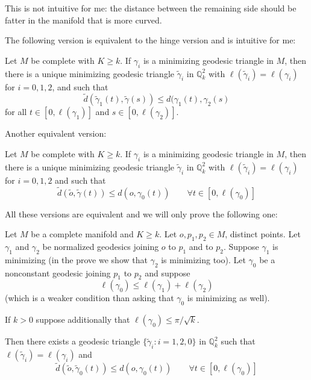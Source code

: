 This is not intuitive for me: the distance
between the remaining side should be
fatter in the manifold that is more curved.

The following version is equivalent to the
hinge version and is intuitive for
me:

\begin{theorem}[Toponogov]
\label{theorem-Toponogov-hinge2}
Let $M$ be complete with $K\geq k$. If
$\gamma_i$ is a minimizing geodesic
triangle in $M$, then there is a unique
minimizing geodesic triangle
$\tilde{\gamma}_i$ in $\mathbb{Q}_k^2$ with
$\ell(\tilde{\gamma}_i)=\ell(\gamma_i)$ for
$i=0,1,2$, and such that
\begin{equation}
\label{equation-Toponogov-hinge2}
\tilde{d}(\tilde{\gamma}_1(t),\tilde{\gamma}
(s))\leq
d(\gamma_1(t),\gamma_2(s)
\end{equation}
for all $t\in[0,\ell(\gamma_1)]$ and
$s\in[0,\ell(\gamma_2)]$.
\end{theorem}

Another equivalent version:
\begin{theorem}[Toponogov]
\label{theorem-Toponogov-hinge3}
Let $M$ be complete with $K\geq k$. If
$\gamma_i$ is a minimizing geodesic
triangle in $M$, then there is a unique
minimizing geodesic triangle
$\tilde{\gamma}_i$ in $\mathbb{Q}_k^2$ with
$\ell(\tilde{\gamma}_i)=\ell(\gamma_i)$ for
$i=0,1,2$ and such that
\begin{equation}
\label{equation-Toponogov-hinge3}
\tilde{d}(\tilde{o},\tilde{\gamma}(t))\leq
d(o,\gamma_0(t))
\qquad \forall t\in[0,\ell(\gamma_0)]
\end{equation}
\end{theorem}
All these versions are equivalent and we will
only prove the following one:
\begin{theorem}
\label{theorem-Toponogov-metric}
Let $M$ be a complete manifold and $K \geq
k$. Let $o,p_1,p_2 \in M$, distinct
points. Let $\gamma_1$ and $\gamma_2$ be
normalized geodesics joining
$o$ to $p_1$ and to $p_2$. Suppose $\gamma_1$
is minimizing (in the prove we
show that $\gamma_2$ is minimizing too).
Let $\gamma_0$ be a nonconstant geodesic
joining $p_1$ to $p_2$ and suppose
$$
\ell(\gamma_0) \leq \ell(\gamma_1)
+\ell(\gamma_2)
$$
(which is a weaker condition than asking that
$\gamma_0$ is minimizing as well).

If $k>0$ suppose additionally that
$\ell(\gamma_0) \leq \pi/\sqrt{k}$.

Then there exists a geodesic triangle
$\{\tilde{\gamma}_i:i=1,2,0\}$ in
$\mathbb{Q}_k^2$ such that
$\ell(\tilde{\gamma}_i) = \ell(\gamma_i)$ and
\begin{equation}
\label{equation-Toponogov-metric}
\tilde{d}(\tilde{o},\tilde{\gamma}_0(t))
\leq  d(o,\gamma_0(t))
\qquad \forall t \in[0,\ell(\gamma_0)]
\end{equation}
\end{theorem}


